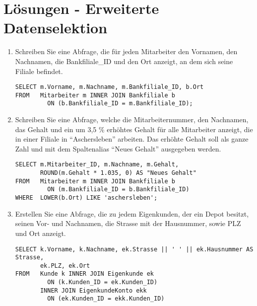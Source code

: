 \clearpage
    \section{L\"osungen - Erweiterte Datenselektion}
      \begin{enumerate}
        \item Schreiben Sie eine Abfrage, die f\"ur jeden Mitarbeiter den
        Vornamen, den Nachnamen, die Bankfiliale\_ID und den Ort anzeigt, an dem
        sich seine Filiale befindet.
        \begin{msoraclesql}[\FALSE]
        \end{msoraclesql}
        \begin{lstlisting}[language=oracle_sql]
SELECT m.Vorname, m.Nachname, m.Bankfiliale_ID, b.Ort
FROM   Mitarbeiter m INNER JOIN Bankfiliale b
         ON (b.Bankfiliale_ID = m.Bankfiliale_ID);
        \end{lstlisting}
        \item Schreiben Sie eine Abfrage, welche die Mitarbeiternummer, den
        Nachnamen, das Gehalt und ein um 3,5 \% erh\"ohtes Gehalt f\"ur alle
        Mitarbeiter anzeigt, die in einer Filiale in \enquote{Aschersleben}
        arbeiten. Das erh\"ohte Gehalt soll als ganze Zahl und mit dem
        Spaltenalias \enquote{Neues Gehalt} ausgegeben werden.
        \begin{msoraclesql}[\FALSE]
        \end{msoraclesql}
        \begin{lstlisting}[language=oracle_sql]
SELECT m.Mitarbeiter_ID, m.Nachname, m.Gehalt,
       ROUND(m.Gehalt * 1.035, 0) AS "Neues Gehalt"
FROM   Mitarbeiter m INNER JOIN Bankfiliale b
         ON (m.Bankfiliale_ID = b.Bankfiliale_ID)
WHERE  LOWER(b.Ort) LIKE 'aschersleben';
        \end{lstlisting}
        \item Erstellen Sie eine Abfrage, die zu jedem Eigenkunden, der ein
        Depot besitzt, seinen Vor- und Nachnamen, die Strasse mit der
        Hausnummer, sowie PLZ und Ort anzeigt.
        \begin{oraclesql}[\FALSE]
        \end{oraclesql}
        \begin{lstlisting}[language=oracle_sql]
SELECT k.Vorname, k.Nachname, ek.Strasse || ' ' || ek.Hausnummer AS Strasse,
       ek.PLZ, ek.Ort
FROM   Kunde k INNER JOIN Eigenkunde ek
         ON (k.Kunden_ID = ek.Kunden_ID)
       INNER JOIN EigenkundeKonto ekk
         ON (ek.Kunden_ID = ekk.Kunden_ID)

\end{lstlisting}
\end{enumerate}
